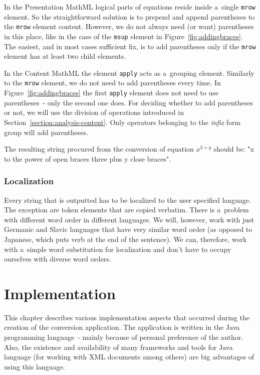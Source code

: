 \documentclass[11pt,oneside,final]{fithesis2}
\begin{document}
In the Presentation MathML logical parts of equations reside inside a~single \texttt{mrow} element. So the straightforward solution is to prepend and append parentheses to the \texttt{mrow} element content. However, we do not always need (or want) parentheses in this place, like in the case of the \texttt{msup} element in Figure~\ref{fig:addingbraces}. The easiest, and in most cases sufficient fix, is to add parentheses only if the \texttt{mrow} element has at least two child elements.

In the Content MathML the element \texttt{apply} acts as a~grouping element. Similarly to the \texttt{mrow} element, we do not need to add parentheses every time. In Figure~\ref{fig:addingbraces} the first \texttt{apply} element does not need to use parentheses~- only the second one does. For deciding whether to add parentheses or not, we will use the division of operations introduced in Section~\ref{section:analysis-content}. Only operators belonging to the \textit{infix} form group will add parentheses.

The resulting string procured from the conversion of equation $x^{3+y}$ should be: "x to the power of open braces three plus y close braces".

\subsection{Localization}
Every string  that is outputted has to be localized to the user specified language. The exception are token elements that are copied verbatim. There is a~problem with different word order in different languages. We will, however, work with just Germanic and Slavic languages that have very similar word order (as opposed to Japanese, which puts verb at the end of the sentence). We can, therefore, work with a~simple word substitution for localization and don't have to occupy ourselves with diverse word orders.

\chapter{Implementation}
\label{chapter:implementation}
This chapter describes various implementation aspects that occurred during the creation of the conversion application. The application is written in the Java programming language~- mainly because of personal preference of the author. Also, the existence and availability of many frameworks and tools for Java language (for working with XML documents among others) are big advantages of using this language. 
\end{document}
